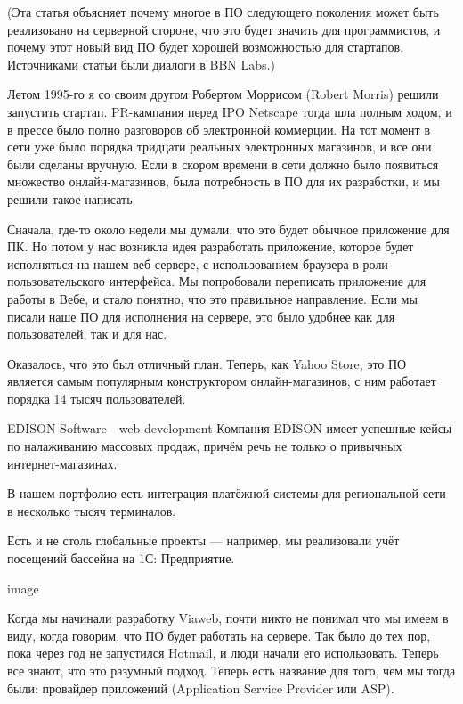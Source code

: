 \documentclass[ebook,12pt,oneside,openany]{memoir}
\date{}
\begin{document}
\maketitle

(Эта статья объясняет почему многое в ПО следующего поколения может
быть реализовано на серверной стороне, что это будет значить для
программистов, и почему этот новый вид ПО будет хорошей возможностью
для стартапов. Источниками статьи были диалоги в BBN Labs.)

Летом 1995-го я со своим другом Робертом Моррисом (Robert Morris)
решили запустить стартап. PR-кампания перед IPO Netscape тогда шла
полным ходом, и в прессе было полно разговоров об электронной
коммерции. На тот момент в сети уже было порядка тридцати реальных
электронных магазинов, и все они были сделаны вручную. Если в скором
времени в сети должно было появиться множество онлайн-магазинов, была
потребность в ПО для их разработки, и мы решили такое написать.

Сначала, где-то около недели мы думали, что это будет обычное
приложение для ПК. Но потом у нас возникла идея разработать
приложение, которое будет исполняться на нашем веб-сервере, с
использованием браузера в роли пользовательского интерфейса. Мы
попробовали переписать приложение для работы в Вебе, и стало понятно,
что это правильное направление. Если мы писали наше ПО для исполнения
на сервере, это было удобнее как для пользователей, так и для нас.

Оказалось, что это был отличный план. Теперь, как Yahoo Store, это ПО
является самым популярным конструктором онлайн-магазинов, с ним
работает порядка 14 тысяч пользователей.

EDISON Software - web-development Компания EDISON имеет успешные кейсы
по налаживанию массовых продаж, причём речь не только о привычных
интернет-магазинах.


В нашем портфолио есть интеграция платёжной системы для региональной
сети в несколько тысяч терминалов.

Есть и не столь глобальные проекты — например, мы реализовали учёт
посещений бассейна на 1С: Предприятие.



image

Когда мы начинали разработку Viaweb, почти никто не понимал что мы
имеем в виду, когда говорим, что ПО будет работать на сервере. Так
было до тех пор, пока через год не запустился Hotmail, и люди начали
его использовать. Теперь все знают, что это разумный подход. Теперь
есть название для того, чем мы тогда были: провайдер приложений
(Application Service Provider или ASP).
\end{document}
